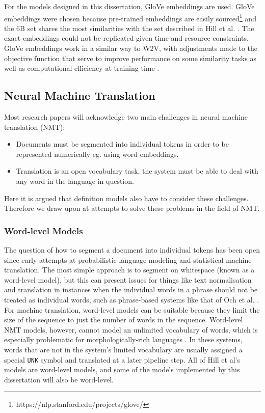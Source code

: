 \documentclass[11pt]{article}
\begin{document}
\begin{spacing}{1}
For the models designed in this dissertation, GloVe embeddings \cite{pennington2014glove} are used. GloVe embeddings were chosen because pre-trained embeddings are easily sourced\footnote{https://nlp.stanford.edu/projects/glove/} and the 6B set shares the most similarities with the set described in Hill et al. \citeyear{hill2015learning}. The exact embeddings could not be replicated given time and resource constraints. GloVe embeddings work in a similar way to W2V, with adjustments made to the objective function that serve to improve performance on some similarity tasks as well as computational efficiency at training time \cite{pennington2014glove}.

\subsection{Neural Machine Translation}
Most research papers will acknowledge two main challenges in neural machine translation (NMT):
\begin{itemize}
\item Documents must be segmented into individual tokens in order to be represented numerically eg. using word embeddings.
\item Translation is an open vocabulary task, the system must be able to deal with any word in the language in question.
\end{itemize}
Here it is argued that definition models also have to consider these challenges. Therefore we draw upon at attempts to solve these problems in the field of NMT.

\subsubsection{Word-level Models}

The question of how to segment a document into individual tokens has been open since early attempts at probabilistic language modeling and statistical machine translation. The most simple approach is to segment on whitespace (known as a word-level model), but this can present issues for things like text normalisation and translation in instances when the individual words in a phrase should not be treated as individual words, such as phrase-based systems like that of Och et al. \citeyear{och1999improved}. For machine translation, word-level models can be suitable because they limit the size of the sequence to just the number of words in the sequence. Word-level NMT models, however, cannot model an unlimited vocabulary of words, which is especially problematic for morphologically-rich languages \cite{lee2016fully}. In these systems, words that are not in the system's limited vocabulary are usually assigned a special \texttt{UNK} symbol and translated at a later pipeline step. All of Hill et al's \citeyear{hill2015learning} models are word-level models, and some of the models implemented by this dissertation will also be word-level.


\end{spacing}
\end{document}
